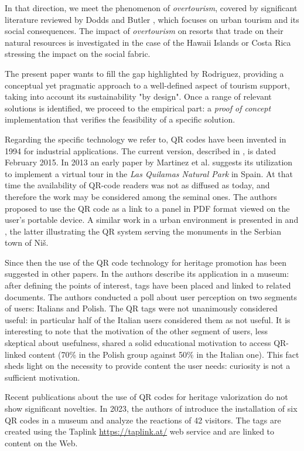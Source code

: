 \documentclass[sustainability,article,submit,pdftex,moreauthors]{Definitions/mdpi}
\begin{document}
In that direction, we meet the phenomenon of {\em overtourism}, covered by significant literature reviewed by Dodds and Butler \cite{dod19a}, which focuses on urban tourism and its social consequences. The impact of {\em overtourism} on resorts that trade on their natural resources is investigated in the case of the Hawaii Islands \cite{lin22a} or Costa Rica \cite{mat10a} stressing the impact on the social fabric.

The present paper wants to fill the gap highlighted by Rodriguez, providing a conceptual yet pragmatic approach to a well-defined aspect of tourism support, taking into account its sustainability "by design". Once a range of relevant solutions is identified, we proceed to the empirical part: a {\em proof of concept} implementation that verifies the feasibility of a specific solution.

Regarding the specific technology we refer to, QR codes have been invented in 1994 for industrial applications. The current version, described in \cite{isoqr}, is dated February 2015. In 2013 an early paper by Martinez et al. \cite{mar13a} suggests its utilization to implement a virtual tour in the {\em Las Quilamas Natural Park} in Spain. At that time the availability of QR-code readers was not as diffused as today, and therefore the work may be considered among the seminal ones. The authors proposed to use the QR code as a link to a panel in PDF format viewed on the user's portable device. A similar work in a urban environment is presented in \cite{fin13a} and \cite{tat15a}, the latter illustrating the QR system serving the monuments in the Serbian town of Niš.

Since then the use of the QR code technology for heritage promotion has been suggested in other papers. In \cite{sol18a} the authors describe its application in a museum: after defining the points of interest, tags have been placed and linked to related documents. The authors conducted a poll about user perception on two segments of users: Italians and Polish. The QR tags were not unanimously considered useful: in particular half of the Italian users considered them as not useful. It is interesting to note that the motivation of the other segment of users, less skeptical about usefulness, shared a solid educational motivation to access QR-linked content (70\% in the Polish group against 50\% in the Italian one). This fact sheds light on the necessity to provide content the user needs: curiosity is not a sufficient motivation.

Recent publications about the use of QR codes for heritage valorization do not show significant novelties. In 2023, the authors of \cite{pan23a} introduce the installation of six QR codes in a museum and analyze the reactions of 42 visitors. The tags are created using the Taplink \url{https://taplink.at/} web service and are linked to content on the Web.
\end{document}
